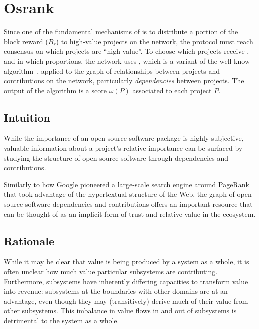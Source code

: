 \section{Osrank}
\label{s:osrank}

\def\Graph{\mathsf{Graph}}
\def\proj{\mathsf{project}}
\def\contributor{\mathsf{account}}
\def\dep{\mathsf{depend}}
\def\own{\mathsf{maintain}}
\def\coown{\mathsf{maintain}^\circ}
\def\contrib{\mathsf{contrib}}
\def\cocontrib{\mathsf{contrib}^\circ}

Since one of the fundamental mechanisms of \oscoin{} is to distribute a portion
of the block reward ($B_r$) to high-value projects on the network, the protocol
must reach consensus on which projects are ``high value''. To choose which
projects receive \oscoin{}, and in which proportions, the network uses
\osrank{}, which is a variant of the well-know \pagerank{}
algorithm~\cite{pagerank}, applied to the graph of relationships between
projects and contributions on the network, particularly
\emph{dependencies} between projects. The output of the \osrank{} algorithm is a score
$\omega(P)$ associated to each project $P$.

\subsection{Intuition}

While the importance of an open source software package is highly subjective,
valuable information about a project's relative importance can be surfaced by
studying the structure of open source software through dependencies and
contributions.

Similarly to how Google pioneered a large-scale search engine around PageRank
that took advantage of the hypertextual structure of the Web, the graph of open
source software dependencies and contributions offers an important resource
that can be thought of as an implicit form of trust and relative value in the
ecosystem.

\subsection{Rationale}

While it may be clear that value is being produced by a system as a whole, it is
often unclear how much value particular subsystems are
contributing. Furthermore, subsystems have inherently differing capacities to
transform value into revenue: subsystems at the boundaries with other domains
are at an advantage, even though they may (transitively) derive much of their
value from other subsystems. This imbalance in value flows in and out of
subsystems is detrimental to the system as a whole.

